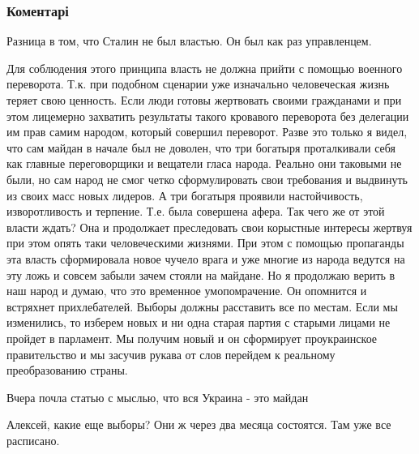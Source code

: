  
 
 
 
 
\subsubsection{Коментарі}

\begin{itemize} %

Разница в том, что Сталин не был властью. Он был как раз управленцем.


Для соблюдения этого принципа власть не должна прийти с помощью военного
переворота. Т.к. при подобном сценарии уже изначально человеческая жизнь теряет
свою ценность. Если люди готовы жертвовать своими гражданами и при этом
лицемерно захватить результаты такого кровавого переворота без делегации им
прав самим народом, который совершил переворот. Разве это только я видел, что
сам майдан в начале был не доволен, что три богатыря проталкивали себя как
главные переговорщики и вещатели гласа народа. Реально они таковыми не были, но
сам народ не смог четко сформулировать свои требования и выдвинуть из своих
масс новых лидеров. А три богатыря проявили настойчивость, изворотливость и
терпение. Т.е. была совершена афера. Так чего же от этой власти ждать? Она и
продолжает преследовать свои корыстные интересы жертвуя при этом опять таки
человеческими жизнями. При этом с помощью пропаганды эта власть сформировала
новое чучело врага и уже многие из народа ведутся на эту ложь и совсем забыли
зачем стояли на майдане. Но я продолжаю верить в наш народ и думаю, что это
временное умопомрачение. Он опомнится и встряхнет прихлебателей. Выборы должны
расставить все по местам. Если мы изменились, то изберем новых и ни одна старая
партия с старыми лицами не пройдет в парламент. Мы получим новый и он
сформирует проукраинское правительство и мы засучив рукава от слов перейдем к
реальному преобразованию страны.


Вчера почла статью с мыслью, что вся Украина - это майдан

Алексей, какие еще выборы? Они ж через два месяца состоятся. Там уже все расписано.


\end{itemize}
